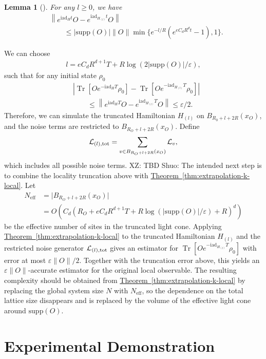 \documentclass[aps,pra,reprint,groupedaddress,floatfix]{revtex4-2}
\newtheorem{lemma}{Lemma}
\newcommand{\thm}[1]{\hyperref[thm:#1]{Theorem~\ref*{thm:#1}}}
\renewcommand{\i}{\mathrm{i}}
\renewcommand{\L}{\mathcal{L}}
\newcommand{\ad}{\mathrm{ad}}
\newcommand{\supp}{\mathrm{supp}}
\newcommand{\eps}{\varepsilon}
\newcommand{\xz}[1]{{\color{cyan} XZ: #1}}
\newcommand{\sz}[1]{{\color{blue} Shuo: #1}}
\begin{document}
\begin{lemma}[{\cite[Lemma 2]{rao2025stability}}]
    For any $l\ge 0$, we have
    \begin{align*}
        &\left\| e^{\i \ad_H t}O - e^{\i \ad_{H_{(l)}}t}O\right\| \\
        &\qquad\le |\supp(O)|\|O\|
        \min\{e^{-l/R}(e^{eC_dR^d t}-1), 1\}.
    \end{align*}
\end{lemma}
We can choose \begin{align*}
    l = eC_d R^{d+1}T+ R\log(2|\supp(O)|/\eps),
\end{align*}
such that for any initial state $\rho_0$
\begin{align*}
    &\left| \operatorname{Tr}[Oe^{-\i \ad_H T}\rho_0]
    - \operatorname{Tr}[Oe^{-\i \ad_{H_{(l)}} T}\rho_0]\right| \\
    &\qquad\le \left\| e^{\i \ad_HT}O
    - e^{\i \ad_{H_{(l)}}T}O\right\| \le \eps/2.
\end{align*}
Therefore, we can simulate the truncated Hamiltonian $H_{(l)}$ on $B_{R_0+l+2R}(x_O)$,  and the noise terms are restricted to $B_{R_O+l+2R}(x_O)$. Define
\begin{align*}
     \L_{(l), \rm tot} =  \sum_{v\in B_{R_O+l+2R}(x_O)} \L_v,
\end{align*}
which includes all possible noise terms. 
\xz{TBD}
\sz{The intended next step is to combine the locality truncation above with \thm{extrapolation-k-local}. Let
\begin{align*}
    N_{\mathrm{eff}}
    &= \big|B_{R_O+l+2R}(x_O)\big| \\
    &= O\!\left(C_d
    (R_O+eC_dR^{d+1}T+R\log(|\supp(O)|/\eps)+R)^d\right)
\end{align*}
be the effective number of sites in the truncated light cone. Applying \thm{extrapolation-k-local} to the truncated Hamiltonian $H_{(l)}$ and the restricted noise generator $\L_{(l),\rm tot}$ gives an estimator for $\operatorname{Tr}[Oe^{-\i\ad_{H_{(l)}}T}\rho_0]$ with error at most $\eps\|O\|/2$. Together with the truncation error above, this yields an $\eps\|O\|$-accurate estimator for the original local observable. The resulting complexity should be obtained from \thm{extrapolation-k-local} by replacing the global system size $N$ with $N_{\mathrm{eff}}$, so the dependence on the total lattice size disappears and is replaced by the volume of the effective light cone around $\supp(O)$.}

\section{Experimental Demonstration}
\end{document}
